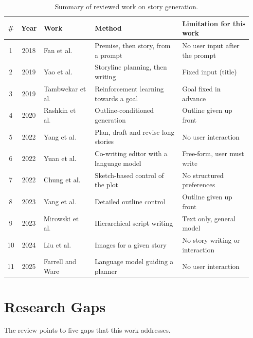 \begin{table}[H]
\centering
\caption{Summary of reviewed work on story generation.}
\label{tab:literature}
\renewcommand{\arraystretch}{1.2}
\small
\begin{tabular}{@{}c c p{3.3cm} p{4.6cm} p{3.4cm}@{}}
\toprule
\textbf{\#} & \textbf{Year} & \textbf{Work} & \textbf{Method} & \textbf{Limitation for this work} \\
\midrule
1 & 2018 & Fan et al.~\cite{fan2018hierarchical} & Premise, then story, from a prompt & No user input after the prompt \\
2 & 2019 & Yao et al.~\cite{yao2019planwrite} & Storyline planning, then writing & Fixed input (title) \\
3 & 2019 & Tambwekar et al.~\cite{tambwekar2019reward} & Reinforcement learning towards a goal & Goal fixed in advance \\
4 & 2020 & Rashkin et al.~\cite{rashkin2020plotmachines} & Outline-conditioned generation & Outline given up front \\
5 & 2022 & Yang et al.~\cite{yang2022re3} & Plan, draft and revise long stories & No user interaction \\
6 & 2022 & Yuan et al.~\cite{yuan2022wordcraft} & Co-writing editor with a language model & Free-form, user must write \\
7 & 2022 & Chung et al.~\cite{chung2022talebrush} & Sketch-based control of the plot & No structured preferences \\
8 & 2023 & Yang et al.~\cite{yang2023doc} & Detailed outline control & Outline given up front \\
9 & 2023 & Mirowski et al.~\cite{mirowski2023dramatron} & Hierarchical script writing & Text only, general model \\
10 & 2024 & Liu et al.~\cite{liu2024grimm} & Images for a given story & No story writing or interaction \\
11 & 2025 & Farrell and Ware~\cite{farrell2024narrative} & Language model guiding a planner & No user interaction \\
\bottomrule
\end{tabular}
\end{table}

\section{Research Gaps}
\label{sec:lit-gaps}

The review points to five gaps that this work addresses.

